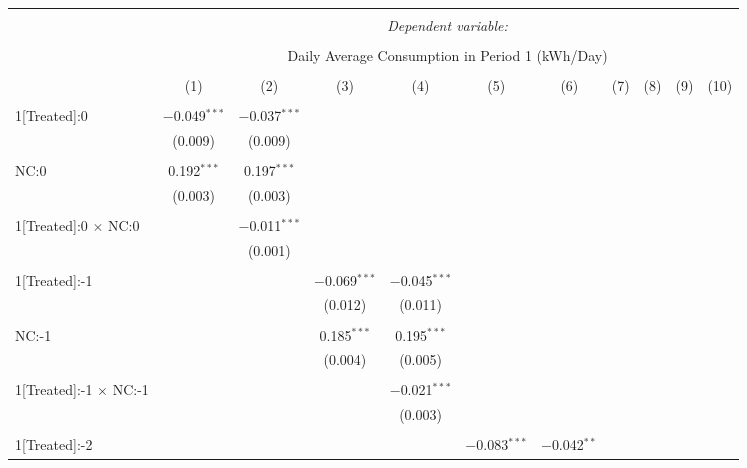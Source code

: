 
\begin{table}[!htbp] \centering 
  \caption{} 
  \label{} 
\tiny 
\begin{tabular}{@{\extracolsep{5pt}}lcccccccccc} 
\\[-1.8ex]\hline 
\hline \\[-1.8ex] 
 & \multicolumn{10}{c}{\textit{Dependent variable:}} \\ 
\cline{2-11} 
\\[-1.8ex] & \multicolumn{10}{c}{Daily Average Consumption in Period 1 (kWh/Day)} \\ 
\\[-1.8ex] & (1) & (2) & (3) & (4) & (5) & (6) & (7) & (8) & (9) & (10)\\ 
\hline \\[-1.8ex] 
 1[Treated]:0 & $-$0.049$^{***}$ & $-$0.037$^{***}$ &  &  &  &  &  &  &  &  \\ 
  & (0.009) & (0.009) &  &  &  &  &  &  &  &  \\ 
  & & & & & & & & & & \\ 
 NC:0 & 0.192$^{***}$ & 0.197$^{***}$ &  &  &  &  &  &  &  &  \\ 
  & (0.003) & (0.003) &  &  &  &  &  &  &  &  \\ 
  & & & & & & & & & & \\ 
 1[Treated]:0 $\times$ NC:0 &  & $-$0.011$^{***}$ &  &  &  &  &  &  &  &  \\ 
  &  & (0.001) &  &  &  &  &  &  &  &  \\ 
  & & & & & & & & & & \\ 
 1[Treated]:-1 &  &  & $-$0.069$^{***}$ & $-$0.045$^{***}$ &  &  &  &  &  &  \\ 
  &  &  & (0.012) & (0.011) &  &  &  &  &  &  \\ 
  & & & & & & & & & & \\ 
 NC:-1 &  &  & 0.185$^{***}$ & 0.195$^{***}$ &  &  &  &  &  &  \\ 
  &  &  & (0.004) & (0.005) &  &  &  &  &  &  \\ 
  & & & & & & & & & & \\ 
 1[Treated]:-1 $\times$ NC:-1 &  &  &  & $-$0.021$^{***}$ &  &  &  &  &  &  \\ 
  &  &  &  & (0.003) &  &  &  &  &  &  \\ 
  & & & & & & & & & & \\ 
 1[Treated]:-2 &  &  &  &  & $-$0.083$^{***}$ & $-$0.042$^{**}$ &  &  &  &  \\ 

\end{tabular}
\end{table}

